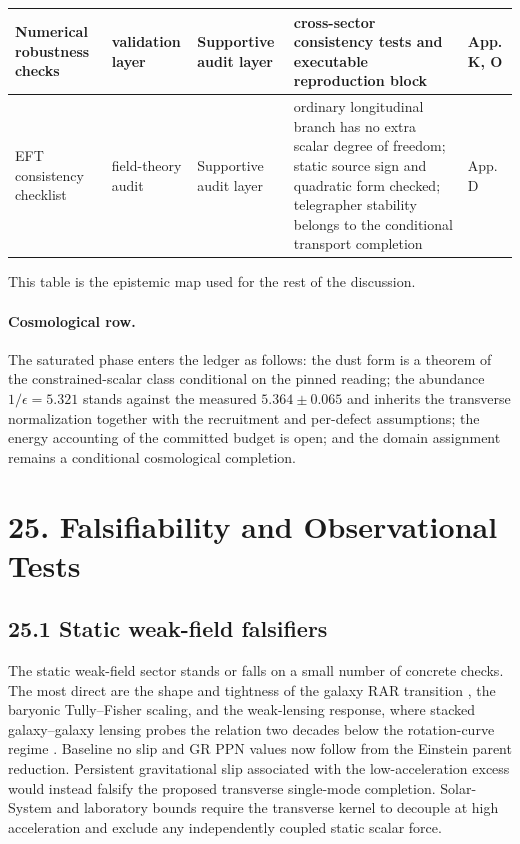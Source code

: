 \documentclass[11pt]{article}
\begin{document}
\begin{longtable}{|L{0.18\textwidth}|L{0.13\textwidth}|L{0.16\textwidth}|L{0.33\textwidth}|L{0.13\textwidth}|}
\hline
Numerical robustness checks & validation layer & Supportive audit layer & cross-sector consistency tests and executable reproduction block & App. K, O \\
\hline
EFT consistency checklist & field-theory audit & Supportive audit layer & ordinary longitudinal branch has no extra scalar degree of freedom; static source sign and quadratic form checked; telegrapher stability belongs to the conditional transport completion & App. D \\
\hline
\end{longtable}
\endgroup

This table is the epistemic map used for the rest of the discussion.

\paragraph{Cosmological row.}
The saturated phase enters the ledger as follows: the dust form is a theorem of the constrained-scalar class conditional on the pinned reading; the abundance $1/\epsilon=5.321$ stands against the measured $5.364\pm0.065$ and inherits the transverse normalization together with the recruitment and per-defect assumptions; the energy accounting of the committed budget is open; and the domain assignment remains a conditional cosmological completion.

\section{25. Falsifiability and Observational Tests}

\subsection{25.1 Static weak-field falsifiers}

The static weak-field sector stands or falls on a small number of concrete checks. The most direct are the shape and tightness of the galaxy RAR transition \citep{McGaugh2016,Lelli2016}, the baryonic Tully--Fisher scaling, and the weak-lensing response, where stacked galaxy--galaxy lensing probes the relation two decades below the rotation-curve regime \citep{Brouwer2021}. Baseline no slip and GR PPN values now follow from the Einstein parent reduction. Persistent gravitational slip associated with the low-acceleration excess would instead falsify the proposed transverse single-mode completion. Solar-System and laboratory bounds \citep{Bertotti2003,Will2014,Adelberger2003} require the transverse kernel to decouple at high acceleration and exclude any independently coupled static scalar force.
\end{document}
